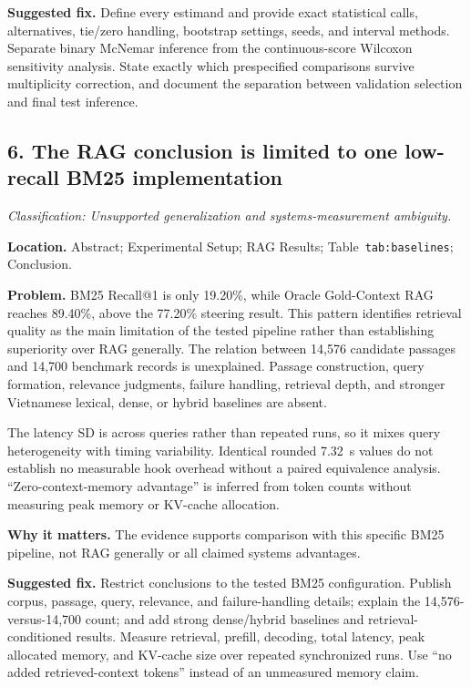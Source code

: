 \documentclass[11pt]{article}
\newcommand{\findinglabel}[1]{\textbf{#1}}
\newcommand{\classification}[1]{\textit{Classification: #1.}}
\begin{document}
\findinglabel{Suggested fix.} Define every estimand and provide exact statistical calls, alternatives, tie/zero handling, bootstrap settings, seeds, and interval methods.  Separate binary McNemar inference from the continuous-score Wilcoxon sensitivity analysis.  State exactly which prespecified comparisons survive multiplicity correction, and document the separation between validation selection and final test inference.

\subsection*{6. The RAG conclusion is limited to one low-recall BM25 implementation}

\classification{Unsupported generalization and systems-measurement ambiguity}

\findinglabel{Location.} Abstract; Experimental Setup; RAG Results; Table~\texttt{tab:baselines}; Conclusion.

\findinglabel{Problem.} BM25 Recall@1 is only 19.20\%, while Oracle Gold-Context RAG reaches 89.40\%, above the 77.20\% steering result.  This pattern identifies retrieval quality as the main limitation of the tested pipeline rather than establishing superiority over RAG generally.  The relation between 14,576 candidate passages and 14,700 benchmark records is unexplained.  Passage construction, query formation, relevance judgments, failure handling, retrieval depth, and stronger Vietnamese lexical, dense, or hybrid baselines are absent.

The latency SD is across queries rather than repeated runs, so it mixes query heterogeneity with timing variability.  Identical rounded 7.32~s values do not establish no measurable hook overhead without a paired equivalence analysis.  ``Zero-context-memory advantage'' is inferred from token counts without measuring peak memory or KV-cache allocation.

\findinglabel{Why it matters.} The evidence supports comparison with this specific BM25 pipeline, not RAG generally or all claimed systems advantages.

\findinglabel{Suggested fix.} Restrict conclusions to the tested BM25 configuration.  Publish corpus, passage, query, relevance, and failure-handling details; explain the 14,576-versus-14,700 count; and add strong dense/hybrid baselines and retrieval-conditioned results.  Measure retrieval, prefill, decoding, total latency, peak allocated memory, and KV-cache size over repeated synchronized runs.  Use ``no added retrieved-context tokens'' instead of an unmeasured memory claim.
\end{document}
